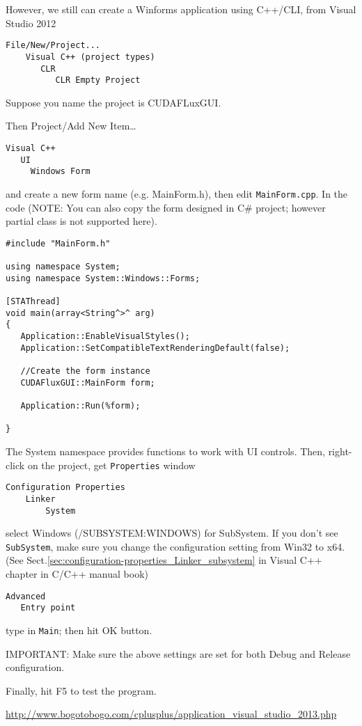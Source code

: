However, we still can create a Winforms application using C++/CLI, from Visual
Studio 2012
\begin{verbatim}
File/New/Project...
    Visual C++ (project types)
       CLR
          CLR Empty Project	
\end{verbatim}
Suppose you name the project is CUDAFLuxGUI.

Then Project/Add New Item\ldots
\begin{verbatim}
Visual C++
   UI
     Windows Form
\end{verbatim}
and create a new form name (e.g. MainForm.h), then edit \verb!MainForm.cpp!. In
the code (NOTE: You can also copy the form designed in C\# project; however
partial class is not supported here).

\begin{verbatim}
#include "MainForm.h"

using namespace System;
using namespace System::Windows::Forms;

[STAThread]
void main(array<String^>^ arg) 
{
   Application::EnableVisualStyles();
   Application::SetCompatibleTextRenderingDefault(false);
   
   //Create the form instance
   CUDAFluxGUI::MainForm form;
   
   Application::Run(%form);

}
\end{verbatim}
The System namespace provides functions to work with UI controls. Then,
right-click on the project, get \verb!Properties! window
\begin{verbatim}
Configuration Properties
    Linker
        System
\end{verbatim}
select  Windows (/SUBSYSTEM:WINDOWS) for SubSystem. If you don't see
\verb!SubSystem!, make sure you change the configuration setting from Win32 to
x64. (See Sect.\ref{sec:configuration-properties_Linker_subsystem} in
Visual C++ chapter in C/C++ manual book)

\begin{verbatim}
Advanced
   Entry point
\end{verbatim}
type in \verb!Main!; then hit OK button. 

IMPORTANT: Make sure the above settings are set for both Debug and Release
configuration.

Finally, hit F5 to test the program.

\url{http://www.bogotobogo.com/cplusplus/application_visual_studio_2013.php}


